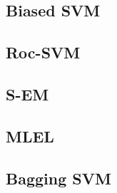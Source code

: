 
\subsection{Biased SVM}


\subsection{Roc-SVM}


\subsection{S-EM}


\subsection{MLEL}


\subsection{Bagging SVM}


